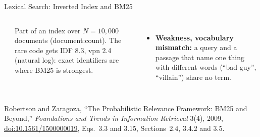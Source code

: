\begin{frame}{Lexical Search: Inverted Index and BM25}
\begin{columns}[T,onlytextwidth]
{{}\\[0.25em]
      {\scriptsize Part of an index over $N = 10{,}000$ documents (document:count). The rare code gets IDF 8.3, vpn 2.4 (natural log): exact identifiers are where BM25 is strongest.\par}\par}
      \begin{itemize}\scriptsize
        \item[\textcolor{red}{$\blacktriangleright$}] \textbf{Weakness, vocabulary mismatch:} a query and a passage that name one thing with different words (``bad guy'', ``villain'') share no term.
      \end{itemize}
  \end{columns}
  \vspace{0.1em}
  {\scriptsize Robertson and Zaragoza, ``The Probabilistic Relevance Framework: BM25 and Beyond,'' \textit{Foundations and Trends in Information Retrieval} 3(4), 2009, \href{https://doi.org/10.1561/1500000019}{doi:10.1561/1500000019}, Eqs.~3.3 and 3.15, Sections~2.4, 3.4.2 and 3.5.\par}
\end{frame}

